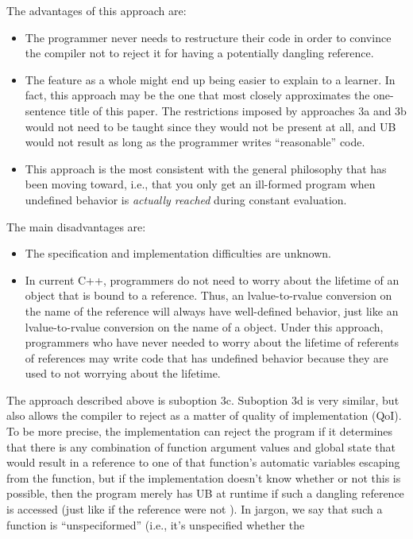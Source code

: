 \documentclass{wg21}
\begin{document}
The advantages of this approach are:
\begin{itemize}
\item The programmer never needs to restructure their code in order to convince
the compiler not to reject it for having a potentially dangling
 reference.
\item The feature as a whole might end up being easier to explain to a learner.
In fact, this approach may be the one that most closely approximates the
one-sentence title of this paper. The restrictions imposed by approaches 3a and
3b would not need to be taught since they would not be present at all, and UB
would not result as long as the programmer writes ``reasonable'' code.
\item This approach is the most consistent with the general philosophy that
 has been moving toward, i.e., that you only get an ill-formed
program when undefined behavior is \emph{actually reached} during constant
evaluation.
\end{itemize}
The main disadvantages are:
\begin{itemize}
\item The specification and implementation difficulties are unknown.
\item In current C++, programmers do not need to worry about the lifetime of an
object that is bound to a  reference. Thus, an lvalue-to-rvalue
conversion on the name of the reference will always have well-defined behavior,
just like an lvalue-to-rvalue conversion on the name of a 
object. Under this approach, programmers who have never needed to worry about
the lifetime of referents of  references may write code that
has undefined behavior because they are used to not worrying about the lifetime.
\end{itemize}
The approach described above is suboption 3c. Suboption 3d is very similar, but
also allows the compiler to reject  as a matter of quality of
implementation (QoI). To be more precise, the implementation can reject the
program if it determines that there is any combination of function argument
values and global state that would result in a  reference to
one of that function's automatic variables escaping from the function, but if
the implementation doesn't know whether or not this is possible, then the
program merely has UB at runtime if such a dangling reference is accessed (just
like if the reference were not ). In jargon, we say that such
a function is ``unspeciformed'' (i.e., it's unspecified whether the
\end{document}
